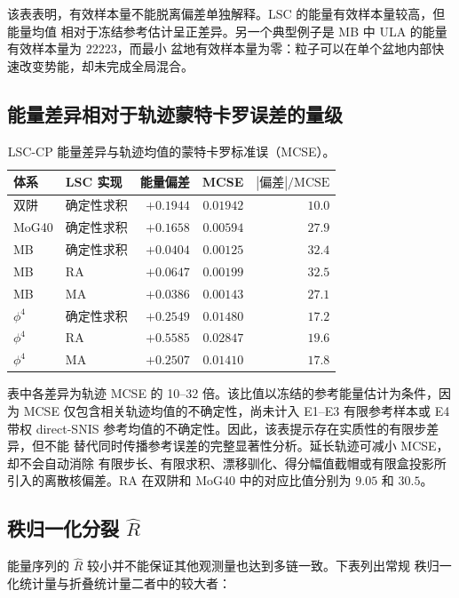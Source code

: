 \documentclass[11pt,a4paper]{article}
\begin{document}
该表表明，有效样本量不能脱离偏差单独解释。LSC 的能量有效样本量较高，但能量均值
相对于冻结参考估计呈正差异。另一个典型例子是 MB 中 ULA 的能量有效样本量为
$22223$，而最小
盆地有效样本量为零：粒子可以在单个盆地内部快速改变势能，却未完成全局混合。

\subsection{能量差异相对于轨迹蒙特卡罗误差的量级}

\begin{table}[H]
\centering
\small
\begin{tabular}{llrrr}
\toprule
体系 & LSC 实现 & 能量偏差 & MCSE & $|\text{偏差}|/\mathrm{MCSE}$ \\
\midrule
双阱 & 确定性求积 & $+0.1944$ & $0.01942$ & $10.0$ \\
MoG40 & 确定性求积 & $+0.1658$ & $0.00594$ & $27.9$ \\
MB & 确定性求积 & $+0.0404$ & $0.00125$ & $32.4$ \\
MB & RA & $+0.0647$ & $0.00199$ & $32.5$ \\
MB & MA & $+0.0386$ & $0.00143$ & $27.1$ \\
$\phi^4$ & 确定性求积 & $+0.2549$ & $0.01480$ & $17.2$ \\
$\phi^4$ & RA & $+0.5585$ & $0.02847$ & $19.6$ \\
$\phi^4$ & MA & $+0.2507$ & $0.01410$ & $17.8$ \\
\bottomrule
\end{tabular}
\caption{LSC-CP 能量差异与轨迹均值的蒙特卡罗标准误（MCSE）。}
\end{table}

表中各差异为轨迹 MCSE 的 10--32 倍。该比值以冻结的参考能量估计为条件，因为
MCSE 仅包含相关轨迹均值的不确定性，尚未计入 E1--E3 有限参考样本或 E4 带权
direct-SNIS 参考均值的不确定性。因此，该表提示存在实质性的有限步差异，但不能
替代同时传播参考误差的完整显著性分析。延长轨迹可减小 MCSE，却不会自动消除
有限步长、有限求积、漂移驯化、得分幅值截帽或有限盒投影所引入的离散核偏差。RA
在双阱和 MoG40 中的对应比值分别为 $9.05$ 和 $30.5$。

\subsection{\texorpdfstring{秩归一化分裂 $\widehat R$}{秩归一化分裂 Rhat}}

能量序列的 $\widehat R$ 较小并不能保证其他观测量也达到多链一致。下表列出常规
秩归一化统计量与折叠统计量二者中的较大者：
\end{document}
